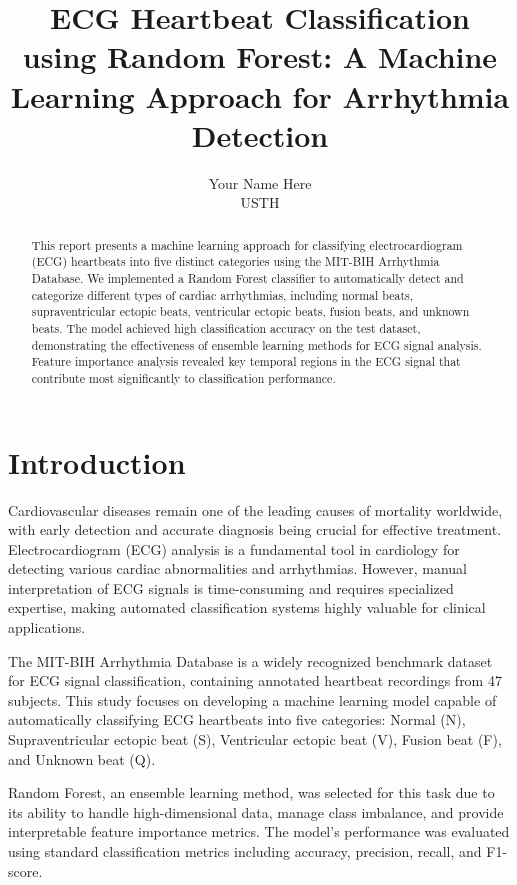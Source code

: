 \documentclass[conference]{IEEEtran}
\title{ECG Heartbeat Classification using Random Forest: A Machine Learning Approach for Arrhythmia Detection}
\author{Your Name Here\\USTH}
\begin{document}
\maketitle

\begin{abstract}
This report presents a machine learning approach for classifying electrocardiogram (ECG) heartbeats into five distinct categories using the MIT-BIH Arrhythmia Database. We implemented a Random Forest classifier to automatically detect and categorize different types of cardiac arrhythmias, including normal beats, supraventricular ectopic beats, ventricular ectopic beats, fusion beats, and unknown beats. The model achieved high classification accuracy on the test dataset, demonstrating the effectiveness of ensemble learning methods for ECG signal analysis. Feature importance analysis revealed key temporal regions in the ECG signal that contribute most significantly to classification performance.
\end{abstract}

\section{Introduction}

Cardiovascular diseases remain one of the leading causes of mortality worldwide, with early detection and accurate diagnosis being crucial for effective treatment. Electrocardiogram (ECG) analysis is a fundamental tool in cardiology for detecting various cardiac abnormalities and arrhythmias. However, manual interpretation of ECG signals is time-consuming and requires specialized expertise, making automated classification systems highly valuable for clinical applications.

The MIT-BIH Arrhythmia Database is a widely recognized benchmark dataset for ECG signal classification, containing annotated heartbeat recordings from 47 subjects. This study focuses on developing a machine learning model capable of automatically classifying ECG heartbeats into five categories: Normal (N), Supraventricular ectopic beat (S), Ventricular ectopic beat (V), Fusion beat (F), and Unknown beat (Q).

Random Forest, an ensemble learning method, was selected for this task due to its ability to handle high-dimensional data, manage class imbalance, and provide interpretable feature importance metrics. The model's performance was evaluated using standard classification metrics including accuracy, precision, recall, and F1-score.
\end{document}
